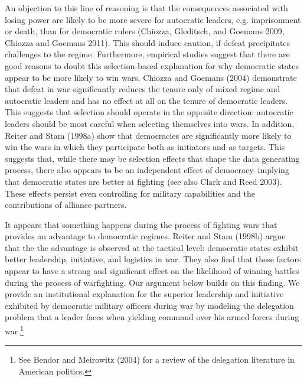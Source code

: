 \documentclass[11pt,]{article}
\begin{document}

An objection to this line of reasoning is that the consequences associated with losing power are likely to be more severe for autocratic leaders, e.g. imprisonment or death, than for democratic rulers (Chiozza, Gleditsch, and Goemans 2009, Chiozza and Goemans 2011).  This should induce caution, if defeat precipitates challenges to the regime. Furthermore, empirical studies suggest that there are good reasons to doubt this selection-based explanation for why democratic states appear to be more likely to win wars. Chiozza and Goemans (2004) demonstrate that defeat in war significantly reduces the tenure only of mixed regime and autocratic leaders and has no effect at all on the tenure of democratic leaders. This suggests that selection should operate in the opposite direction:  autocratic leaders should be most careful when selecting themselves into wars.  In addition, Reiter and Stam (1998a) show that democracies are significantly more likely to win the wars in which they participate both as initiators and as targets. This suggests that, while there may be selection effects that shape the data generating process, there also appears to be an independent effect of democracy--implying that democratic states are better at fighting (see also Clark and Reed 2003). These effects persist even controlling for military capabilities and the contributions of alliance partners.

It appears that something happens during the process of fighting wars that provides an advantage to democratic regimes. Reiter and Stam (1998b) argue that the the advantage is observed at the tactical level:  democratic states exhibit better leadership, initiative, and logistics in war.  They also find that these factors appear to have a strong and significant effect on the likelihood of winning battles during the process of warfighting.  Our argument below builds on this finding.  We provide an institutional explanation for the superior leadership and initiative exhibited by democratic military officers during war by modeling the delegation problem that a leader faces when yielding command over his armed forces during war.\footnote{\normalsize See Bendor and Meirowitz (2004) for a review of the delegation literature in American politics.}
\end{document}
